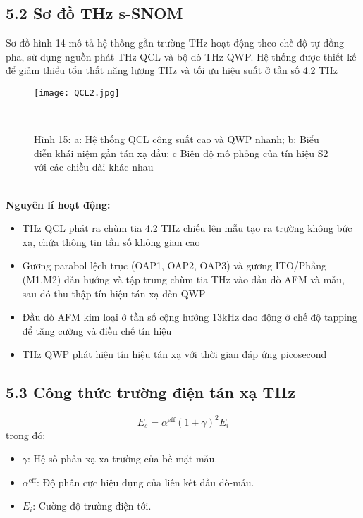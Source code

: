 \documentclass[a4paper,13pt]{article}
\begin{document}
\subsection{5.2 Sơ đồ THz s-SNOM}
Sơ đồ hình 14 mô tả hệ thống gần trường THz hoạt động theo chế độ tự đồng pha, sử dụng nguồn phát THz QCL và bộ dò THz QWP. Hệ thống được thiết kế để giảm thiểu tổn thất năng lượng THz và tối ưu hiệu suất ở tần số 4.2 THz
\begin{figure}[htbp]
    \centering
\texttt{[image: QCL2.jpg]}
    \caption*{Hình 15: a: Hệ thống QCL công suất cao và QWP nhanh; b: Biểu diễn khái niệm gần tán xạ đầu; c Biên độ mô phỏng của tín hiệu S2 với các chiều dài khác nhau\cite{key5} } \\

    \label{fig:model}
\end{figure} \\
\textbf{Nguyên lí hoạt động:}
\begin{itemize}
\item THz QCL phát ra chùm tia 4.2 THz chiếu lên mẫu tạo ra trường không bức xạ, chứa thông tin tần số không gian cao
\item Gương parabol lệch trục (OAP1, OAP2, OAP3) và gương ITO/Phẳng (M1,M2) dẫn hướng và tập trung chùm tia THz vào đầu dò AFM và mẫu, sau đó thu thập tín hiệu tán xạ đến QWP
\item Đầu dò AFM kim loại ở tần số cộng hưởng 13kHz dao động ở chế độ tapping để tăng cường và điều chế tín hiệu
\item THz QWP phát hiện tín hiệu tán xạ với thời gian đáp ứng picosecond

\end{itemize}


\subsection{5.3 Công thức trường điện tán xạ THz}
\begin{equation}
E_s = \alpha^{\text{eff}} (1 + \gamma)^2 E_i  \tag{8}
\label{eq:scattered_field}
\end{equation}
trong đó:
\begin{itemize}
    \item \( \gamma \): Hệ số phản xạ xa trường của bề mặt mẫu.
    \item \( \alpha^{\text{eff}} \): Độ phân cực hiệu dụng của liên kết đầu dò-mẫu.
    \item \( E_i \): Cường độ trường điện tới.
\end{itemize}
\end{document}
